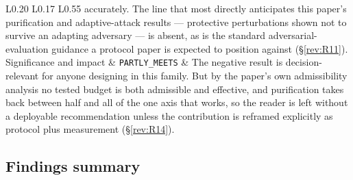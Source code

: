 \documentclass[11pt,a4paper]{article}
\begin{document}
\begin{longtable}{L{0.20\textwidth} L{0.17\textwidth} L{0.55\textwidth}}
accurately. The line that most directly anticipates this paper's purification
and adaptive-attack results --- protective perturbations shown not to survive an
adapting adversary --- is absent, as is the standard adversarial-evaluation
guidance a protocol paper is expected to position against (\S\ref{rev:R11}). \\
\addlinespace
Significance and impact &
\texttt{PARTLY\_MEETS} &
The negative result is decision-relevant for anyone designing in this family.
But by the paper's own admissibility analysis no tested budget is both
admissible and effective, and purification takes back between half and all of
the one axis that works, so the reader is left without a deployable
recommendation unless the contribution is reframed explicitly as protocol
plus measurement (\S\ref{rev:R14}). \\
\bottomrule
\end{longtable}

\subsection*{Findings summary}
\end{document}
